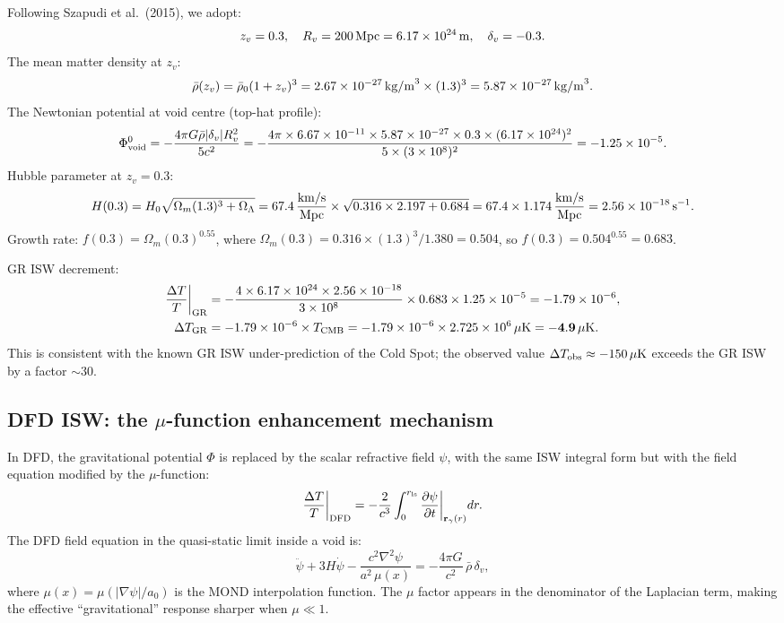 \documentclass[11pt]{article}
\newcommand{\ee}[1]{\times 10^{#1}}
\newcommand{\mufd}{\mu}
\newcommand{\DFD}{{\rm DFD}}
\newcommand{\GR}{{\rm GR}}
\newcommand{\deltaT}{\Delta T}
\begin{document}
Following Szapudi et al.\ (2015), we adopt:
\[
  z_v = 0.3,\quad R_v = 200\,{\rm Mpc} = 6.17\ee{24}\,{\rm m},
  \quad \delta_v = -0.3.
\]
The mean matter density at $z_v$:
\[
  \bar\rho(z_v) = \bar\rho_0(1+z_v)^3
  = 2.67\ee{-27}\,{\rm kg/m}^3\times (1.3)^3
  = 5.87\ee{-27}\,{\rm kg/m}^3.
\]
The Newtonian potential at void centre (top-hat profile):
\begin{equation}\label{eq:phi-void}
  \Phi_{\rm void}^0 = -\frac{4\pi G\bar\rho|\delta_v|R_v^2}{5c^2}
  = -\frac{4\pi\times 6.67\ee{-11}\times 5.87\ee{-27}
    \times 0.3\times (6.17\ee{24})^2}
    {5\times(3\ee{8})^2}
  = -1.25\ee{-5}.
\end{equation}
Hubble parameter at $z_v = 0.3$:
\[
  H(0.3) = H_0\sqrt{\Omega_m(1.3)^3 + \Omega_\Lambda}
  = 67.4\,\frac{{\rm km/s}}{{\rm Mpc}}
    \times\sqrt{0.316\times 2.197 + 0.684}
  = 67.4\times 1.174\,\frac{{\rm km/s}}{{\rm Mpc}}
  = 2.56\ee{-18}\,{\rm s}^{-1}.
\]
Growth rate: $f(0.3) = \Omega_m(0.3)^{0.55}$, where
$\Omega_m(0.3) = 0.316\times(1.3)^3/1.380 = 0.504$, so
$f(0.3) = 0.504^{0.55} = 0.683$.

GR ISW decrement:
\begin{align}
  \frac{\deltaT}{T}\bigg|_{\GR}
  &= -\frac{4\times 6.17\ee{24}\times 2.56\ee{-18}}{3\ee{8}}
    \times 0.683\times 1.25\ee{-5}
  = -1.79\ee{-6}, \nonumber\\
  \deltaT_{\GR} &= -1.79\ee{-6}\times T_{\rm CMB}
  = -1.79\ee{-6}\times 2.725\ee{6}\,\mu{\rm K} = \mathbf{-4.9\,\mu{\rm K}}.
\end{align}
This is consistent with the known GR ISW under-prediction of the Cold
Spot; the observed value $\deltaT_{\rm obs} \approx -150\,\mu{\rm K}$
exceeds the GR ISW by a factor $\sim 30$.

\subsection{DFD ISW: the $\mu$-function enhancement mechanism}
\label{sec:dfd-isw-mechanism}

In DFD, the gravitational potential $\Phi$ is replaced by the scalar
refractive field $\psi$, with the same ISW integral form but with the
field equation modified by the $\mu$-function:
\begin{equation}\label{eq:isw-dfd}
  \frac{\deltaT}{T}\bigg|_{\DFD}
  = -\frac{2}{c^3}\int_0^{r_{\rm ls}}
    \frac{\partial\psi}{\partial t}\bigg|_{\mathbf{r}_\gamma(r)} dr.
\end{equation}
The DFD field equation in the quasi-static limit inside a void is:
\begin{equation}\label{eq:dfd-void-eq}
  \ddot\psi + 3H\dot\psi - \frac{c^2\nabla^2\psi}{a^2\,\mufd(x)}
  = -\frac{4\pi G}{c^2}\,\bar\rho\,\delta_v,
\end{equation}
where $\mufd(x) = \mu(|\nabla\psi|/a_0)$ is the MOND interpolation function.
The $\mufd$ factor appears in the denominator of the Laplacian term,
making the effective ``gravitational'' response sharper when $\mufd \ll 1$.
\end{document}
